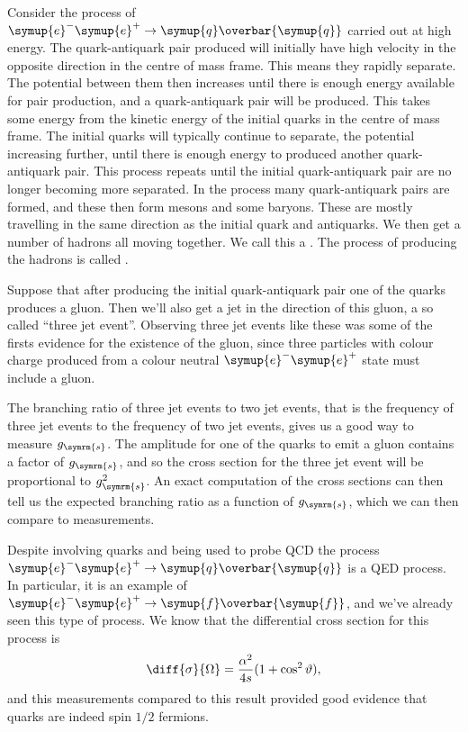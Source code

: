 \documentclass[fleqn]{NotesClass}
\newcommand{\Pparticle}[1]{\symup{#1}}
\newcommand{\Pe}{\ensuremath{\Pparticle{e}^{-}}}
\newcommand{\Pq}{\ensuremath{\Pparticle{q}}}
\newcommand{\Pf}{\ensuremath{\Pparticle{f}}}
\newcommand{\APantiparticle}[1]{\overbar{#1}}
\newcommand{\APe}{\ensuremath{\Pparticle{e}^{+}}}
\newcommand{\APq}{\ensuremath{\APantiparticle{\Pparticle{q}}}}
\newcommand{\APf}{\ensuremath{\APantiparticle{\Pparticle{f}}}}
\newcommand{\strongCoupling}{g_{\symrm{s}}}
\begin{document}
    Consider the process of \(\Pe\APe \to \Pq\APq\) carried out at high energy.
    The quark-antiquark pair produced will initially have high velocity in the opposite direction in the centre of mass frame.
    This means they rapidly separate.
    The potential between them then increases until there is enough energy available for pair production, and a quark-antiquark pair will be produced.
    This takes some energy from the kinetic energy of the initial quarks in the centre of mass frame.
    The initial quarks will typically continue to separate, the potential increasing further, until there is enough energy to produced another quark-antiquark pair.
    This process repeats until the initial quark-antiquark pair are no longer becoming more separated.
    In the process many quark-antiquark pairs are formed, and these then form mesons and some baryons.
    These are mostly travelling in the same direction as the initial quark and antiquarks.
    We then get a number of hadrons all moving together.
    We call this a .
    The process of producing the hadrons is called .
    
    Suppose that after producing the initial quark-antiquark pair one of the quarks produces a gluon.
    Then we'll also get a jet in the direction of this gluon, a so called \enquote{three jet event}.
    Observing three jet events like these was some of the firsts evidence for the existence of the gluon, since three particles with colour charge produced from a colour neutral \(\Pe\APe\) state must include a gluon.
    
    The branching ratio of three jet events to two jet events, that is the frequency of three jet events to the frequency of two jet events, gives us a good way to measure \(\strongCoupling\).
    The amplitude for one of the quarks to emit a gluon contains a factor of \(\strongCoupling\), and so the cross section for the three jet event will be proportional to \(\strongCoupling^2\).
    An exact computation of the cross sections can then tell us the expected branching ratio as a function of \(\strongCoupling\), which we can then compare to measurements.
    
    Despite involving quarks and being used to probe QCD the process \(\Pe\APe \to \Pq\APq\) is a QED process.
    In particular, it is an example of \(\Pe\APe \to \Pf\APf\), and we've already seen this type of process.
    We know that the differential cross section for this process is
    \begin{equation}
        \diff{\sigma}{\Omega} = \frac{\alpha^2}{4s}(1 + \cos^2\vartheta),
    \end{equation}
    and this measurements compared to this result provided good evidence that quarks are indeed spin \(1/2\) fermions.
    
\end{document}
